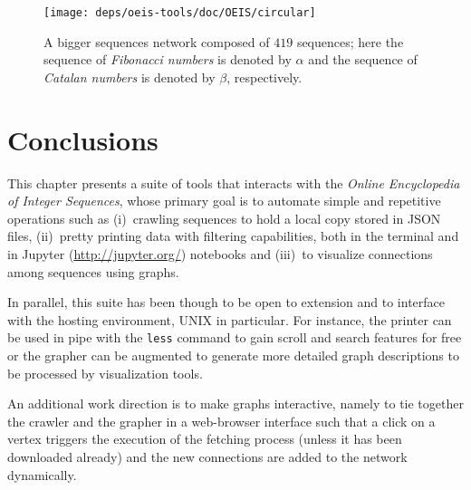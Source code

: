 \begin{figure}
\hspace{-3cm}
\texttt{[image: deps/oeis-tools/doc/OEIS/circular]}
\caption{A bigger sequences network composed of $419$ sequences; here the
sequence of \textit{Fibonacci numbers} is denoted by $\alpha$ and the sequence
of \textit{Catalan numbers} is denoted by $\beta$, respectively.}
\label{fig:oeis:sequences:network:fibonacci:catalan:circular}
\end{figure}

\section*{Conclusions}

This chapter presents a suite of tools that interacts with the \textit{Online
Encyclopedia of Integer Sequences}, whose primary goal is to automate simple
and repetitive operations such as (i)~crawling sequences to hold a local copy
stored in JSON files, (ii)~pretty printing data with filtering capabilities,
both in the terminal and in Jupyter (\url{http://jupyter.org/}) notebooks and
(iii)~to visualize connections among sequences using graphs.

In parallel, this suite has been though to be open to extension
and to interface with the hosting environment, UNIX in particular. For
instance, the printer can be used in pipe with the \verb|less| command to gain
scroll and search features for free or the grapher can be augmented to generate
more detailed graph descriptions to be processed by visualization tools.

An additional work direction is to make graphs interactive, namely to tie
together the crawler and the grapher in a web-browser interface such that a
click on a vertex triggers the execution of the fetching process (unless it has
been downloaded already) and the new connections are added to the network
dynamically.




\iffalse

\begin{figure}
\texttt{[image: deps/oeis-tools/doc/OEIS/fibonacci-catalan]}
\caption{Sequences network fetched by commands issued in the discussed session.}
\label{fig:oeis:sequences:network}
\end{figure}

\notbreakable{
    \inputminted[stripnl=false,firstline=31,lastline=44]
        {python}{deps/oeis-tools/src/graphing.py}
}

\notbreakable{
    \inputminted[stripnl=false,firstline=46,lastline=76]
        {python}{deps/oeis-tools/src/graphing.py}
}

\fi
